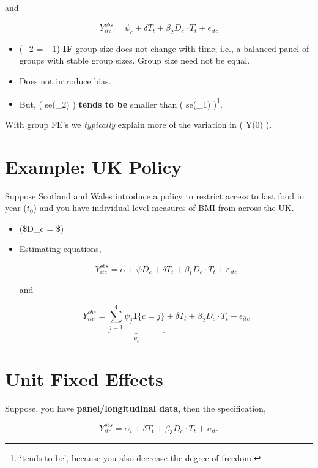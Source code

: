 \documentclass[
  letterpaper,
  DIV=11,
  numbers=noendperiod]{scrreprt}
\providecommand{\tightlist}{%
  \setlength{\itemsep}{0pt}\setlength{\parskip}{0pt}}\usepackage{longtable,booktabs,array}
\theoremstyle{definition}
\theoremstyle{remark}
\begin{document}
\begin{enumerate}
  and

  \[
  Y^{obs}_{itc} = \psi_c + \delta T_t + \beta_2 D_c \cdot T_t + \epsilon_{itc}
  \]

  \begin{itemize}
  \tightlist
  \item
    (\hat{\beta}\_2 = \hat{\beta}\_1) \textbf{IF} group size does not
    change with time; i.e., a balanced panel of groups with stable group
    sizes. Group size need not be equal.
  \item
    Does not introduce bias.
  \item
    But, ( se(\hat{\beta}\_2) ) \textbf{tends to be} smaller than (
    se(\hat{\beta}\_1) )\footnote{`tends to be', because you also
      decrease the degree of freedom.}.
  \end{itemize}

  With group FE's we \emph{typically} explain more of the variation in (
  Y(0) ).

  \section{Example: UK Policy}\label{example-uk-policy}

  Suppose Scotland and Wales introduce a policy to restrict access to
  fast food in year (\(t_0\)) and you have individual-level measures of
  BMI from across the UK.

  \begin{itemize}
  \item
    (\$D\_c = \$)
  \item
    Estimating equations,

    \[
    Y^{obs}_{itc} = \alpha + \psi D_c + \delta T_t + \beta_1 D_c \cdot T_t + \varepsilon_{itc}
    \]

    and

    \[
    Y^{obs}_{itc} = \underbrace{\sum_{j=1}^{4} \psi_j \mathbf{1}\{c = j\}}_{\psi_c} + \delta T_t + \beta_2 D_c \cdot T_t + \epsilon_{itc}
    \]
  \end{itemize}

  \section{Unit Fixed Effects}\label{unit-fixed-effects}

  Suppose, you have \textbf{panel/longitudinal data}, then the
  specification,

  \[
  Y^{obs}_{itc} = \alpha_i + \delta T_t + \beta_3 D_c\cdot T_t + \upsilon_{itc}
  \]


\end{enumerate}
\end{document}
